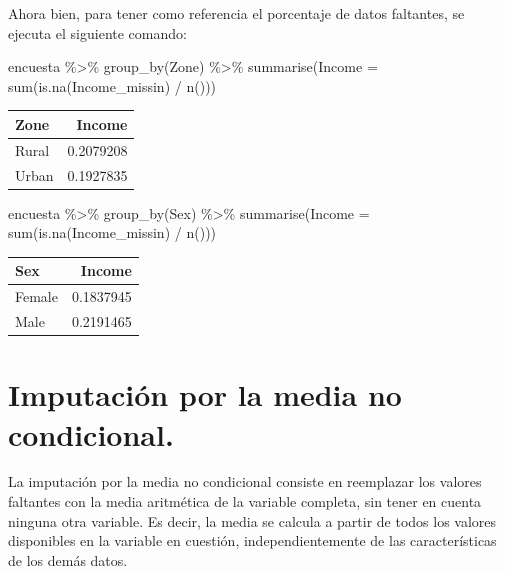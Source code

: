 \documentclass[
  12pt,
]{book}
\newenvironment{Shaded}{\begin{snugshade}}{\end{snugshade}}
\newcommand{\AttributeTok}[1]{\textcolor[rgb]{0.77,0.63,0.00}{#1}}
\newcommand{\FunctionTok}[1]{\textcolor[rgb]{0.00,0.00,0.00}{#1}}
\newcommand{\NormalTok}[1]{#1}
\newcommand{\SpecialCharTok}[1]{\textcolor[rgb]{0.00,0.00,0.00}{#1}}
\begin{document}
Ahora bien, para tener como referencia el porcentaje de datos faltantes, se ejecuta el siguiente comando:

\begin{Shaded}
\begin{Highlighting}[]
\NormalTok{encuesta }\SpecialCharTok{\%\textgreater{}\%} \FunctionTok{group\_by}\NormalTok{(Zone) }\SpecialCharTok{\%\textgreater{}\%} 
  \FunctionTok{summarise}\NormalTok{(}\AttributeTok{Income =} \FunctionTok{sum}\NormalTok{(}\FunctionTok{is.na}\NormalTok{(Income\_missin) }\SpecialCharTok{/} \FunctionTok{n}\NormalTok{()))}
\end{Highlighting}
\end{Shaded}

\begin{tabular}{l|r}
\hline
Zone & Income\\
\hline
Rural & 0.2079208\\
\hline
Urban & 0.1927835\\
\hline
\end{tabular}

\begin{Shaded}
\begin{Highlighting}[]
\NormalTok{encuesta }\SpecialCharTok{\%\textgreater{}\%} \FunctionTok{group\_by}\NormalTok{(Sex) }\SpecialCharTok{\%\textgreater{}\%} 
  \FunctionTok{summarise}\NormalTok{(}\AttributeTok{Income =} \FunctionTok{sum}\NormalTok{(}\FunctionTok{is.na}\NormalTok{(Income\_missin) }\SpecialCharTok{/} \FunctionTok{n}\NormalTok{()))}
\end{Highlighting}
\end{Shaded}

\begin{tabular}{l|r}
\hline
Sex & Income\\
\hline
Female & 0.1837945\\
\hline
Male & 0.2191465\\
\hline
\end{tabular}

\hypertarget{imputaciuxf3n-por-la-media-no-condicional.}{%
\section{Imputación por la media no condicional.}\label{imputaciuxf3n-por-la-media-no-condicional.}}

La imputación por la media no condicional consiste en reemplazar los valores faltantes con la media aritmética de la variable completa, sin tener en cuenta ninguna otra variable. Es decir, la media se calcula a partir de todos los valores disponibles en la variable en cuestión, independientemente de las características de los demás datos.
\end{document}
